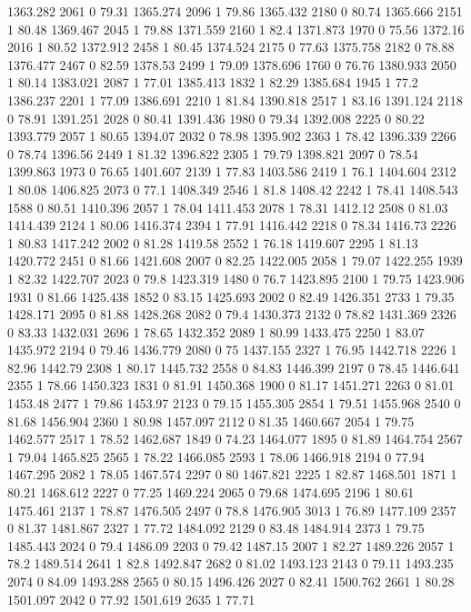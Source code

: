 1363.282	2061	0	79.31
1365.274	2096	1	79.86
1365.432	2180	0	80.74
1365.666	2151	1	80.48
1369.467	2045	1	79.88
1371.559	2160	1	82.4
1371.873	1970	0	75.56
1372.16	2016	1	80.52
1372.912	2458	1	80.45
1374.524	2175	0	77.63
1375.758	2182	0	78.88
1376.477	2467	0	82.59
1378.53	2499	1	79.09
1378.696	1760	0	76.76
1380.933	2050	1	80.14
1383.021	2087	1	77.01
1385.413	1832	1	82.29
1385.684	1945	1	77.2
1386.237	2201	1	77.09
1386.691	2210	1	81.84
1390.818	2517	1	83.16
1391.124	2118	0	78.91
1391.251	2028	0	80.41
1391.436	1980	0	79.34
1392.008	2225	0	80.22
1393.779	2057	1	80.65
1394.07	2032	0	78.98
1395.902	2363	1	78.42
1396.339	2266	0	78.74
1396.56	2449	1	81.32
1396.822	2305	1	79.79
1398.821	2097	0	78.54
1399.863	1973	0	76.65
1401.607	2139	1	77.83
1403.586	2419	1	76.1
1404.604	2312	1	80.08
1406.825	2073	0	77.1
1408.349	2546	1	81.8
1408.42	2242	1	78.41
1408.543	1588	0	80.51
1410.396	2057	1	78.04
1411.453	2078	1	78.31
1412.12	2508	0	81.03
1414.439	2124	1	80.06
1416.374	2394	1	77.91
1416.442	2218	0	78.34
1416.73	2226	1	80.83
1417.242	2002	0	81.28
1419.58	2552	1	76.18
1419.607	2295	1	81.13
1420.772	2451	0	81.66
1421.608	2007	0	82.25
1422.005	2058	1	79.07
1422.255	1939	1	82.32
1422.707	2023	0	79.8
1423.319	1480	0	76.7
1423.895	2100	1	79.75
1423.906	1931	0	81.66
1425.438	1852	0	83.15
1425.693	2002	0	82.49
1426.351	2733	1	79.35
1428.171	2095	0	81.88
1428.268	2082	0	79.4
1430.373	2132	0	78.82
1431.369	2326	0	83.33
1432.031	2696	1	78.65
1432.352	2089	1	80.99
1433.475	2250	1	83.07
1435.972	2194	0	79.46
1436.779	2080	0	75
1437.155	2327	1	76.95
1442.718	2226	1	82.96
1442.79	2308	1	80.17
1445.732	2558	0	84.83
1446.399	2197	0	78.45
1446.641	2355	1	78.66
1450.323	1831	0	81.91
1450.368	1900	0	81.17
1451.271	2263	0	81.01
1453.48	2477	1	79.86
1453.97	2123	0	79.15
1455.305	2854	1	79.51
1455.968	2540	0	81.68
1456.904	2360	1	80.98
1457.097	2112	0	81.35
1460.667	2054	1	79.75
1462.577	2517	1	78.52
1462.687	1849	0	74.23
1464.077	1895	0	81.89
1464.754	2567	1	79.04
1465.825	2565	1	78.22
1466.085	2593	1	78.06
1466.918	2194	0	77.94
1467.295	2082	1	78.05
1467.574	2297	0	80
1467.821	2225	1	82.87
1468.501	1871	1	80.21
1468.612	2227	0	77.25
1469.224	2065	0	79.68
1474.695	2196	1	80.61
1475.461	2137	1	78.87
1476.505	2497	0	78.8
1476.905	3013	1	76.89
1477.109	2357	0	81.37
1481.867	2327	1	77.72
1484.092	2129	0	83.48
1484.914	2373	1	79.75
1485.443	2024	0	79.4
1486.09	2203	0	79.42
1487.15	2007	1	82.27
1489.226	2057	1	78.2
1489.514	2641	1	82.8
1492.847	2682	0	81.02
1493.123	2143	0	79.11
1493.235	2074	0	84.09
1493.288	2565	0	80.15
1496.426	2027	0	82.41
1500.762	2661	1	80.28
1501.097	2042	0	77.92
1501.619	2635	1	77.71
